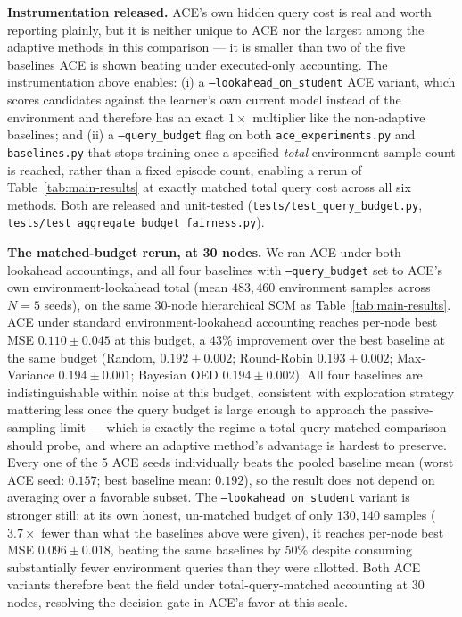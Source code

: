 \documentclass{article}
\theoremstyle{plain}
\theoremstyle{definition}
\theoremstyle{remark}
\begin{document}
\textbf{Instrumentation released.} ACE's own hidden query cost is real and worth reporting plainly, but it is neither unique to ACE nor the largest among the adaptive methods in this comparison --- it is smaller than two of the five baselines ACE is shown beating under executed-only accounting. The instrumentation above enables: (i) a \texttt{--lookahead\_on\_student} ACE variant, which scores candidates against the learner's own current model instead of the environment and therefore has an exact $1\times$ multiplier like the non-adaptive baselines; and (ii) a \texttt{--query\_budget} flag on both \texttt{ace\_experiments.py} and \texttt{baselines.py} that stops training once a specified \emph{total} environment-sample count is reached, rather than a fixed episode count, enabling a rerun of Table~\ref{tab:main-results} at exactly matched total query cost across all six methods. Both are released and unit-tested (\texttt{tests/test\_query\_budget.py}, \texttt{tests/test\_aggregate\_budget\_fairness.py}).

\textbf{The matched-budget rerun, at 30 nodes.} We ran ACE under both lookahead accountings, and all four baselines with \texttt{--query\_budget} set to ACE's own environment-lookahead total (mean $483{,}460$ environment samples across $N{=}5$ seeds), on the same 30-node hierarchical SCM as Table~\ref{tab:main-results}. ACE under standard environment-lookahead accounting reaches per-node best MSE $0.110\pm0.045$ at this budget, a $43\%$ improvement over the best baseline at the same budget (Random, $0.192\pm0.002$; Round-Robin $0.193\pm0.002$; Max-Variance $0.194\pm0.001$; Bayesian OED $0.194\pm0.002$). All four baselines are indistinguishable within noise at this budget, consistent with exploration strategy mattering less once the query budget is large enough to approach the passive-sampling limit --- which is exactly the regime a total-query-matched comparison should probe, and where an adaptive method's advantage is hardest to preserve. Every one of the 5 ACE seeds individually beats the pooled baseline mean (worst ACE seed: $0.157$; best baseline mean: $0.192$), so the result does not depend on averaging over a favorable subset. The \texttt{--lookahead\_on\_student} variant is stronger still: at its own honest, un-matched budget of only $130{,}140$ samples ($3.7\times$ fewer than what the baselines above were given), it reaches per-node best MSE $0.096\pm0.018$, beating the same baselines by $50\%$ despite consuming substantially fewer environment queries than they were allotted. Both ACE variants therefore beat the field under total-query-matched accounting at 30 nodes, resolving the decision gate in ACE's favor at this scale.
\end{document}
